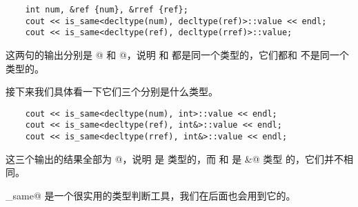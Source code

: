 \begin{lstlisting}
    int num, &ref {num}, &rref {ref};
    cout << is_same<decltype(num), decltype(ref)>::value << endl;
    cout << is_same<decltype(ref), decltype(rref)>::value;
\end{lstlisting}
这两句的输出分别是 @ 和 @，说明 \lstinline@ref@ 和 \lstinline@rref@ 都是同一个类型的，它们都和 \lstinline@num@ 不是同一个类型的。\par
接下来我们具体看一下它们三个分别是什么类型。
\begin{lstlisting}
    cout << is_same<decltype(num), int>::value << endl;
    cout << is_same<decltype(ref), int&>::value << endl;
    cout << is_same<decltype(rref), int&>::value << endl;
\end{lstlisting}
这三个输出的结果全部为 @，说明 \lstinline@num@ 是 \lstinline@int@ 类型的，而 \lstinline@ref@ 和 \lstinline@rref@ 是 \lstinline@int&@ 类型 的，它们并不相同。\par
\lstinline@is_same@ 是一个很实用的类型判断工具，我们在后面也会用到它的。\par
